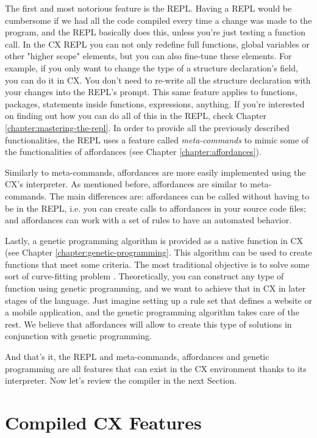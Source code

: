 \documentclass[11pt,fleqn,openany]{book} %
\begin{document}
The first and most notorious feature is the REPL. Having a REPL would be cumbersome if we had all the code compiled every time a change was made to the program, and the REPL basically does this, unless you're just testing a function call. In the CX REPL you can not only redefine full functions, global variables or other "higher scope" elements, but you can also fine-tune these elements. For example, if you only want to change the type of a structure declaration's field, you can do it in CX. You don't need to re-write all the structure declaration with your changes into the REPL's prompt. This same feature applies to functions, packages, statements inside functions, expressions, anything. If you're interested on finding out how you can do all of this in the REPL, check Chapter \ref{chapter:mastering-the-repl}. In order to provide all the previously described functionalities, the REPL uses a feature called \emph{meta-commands} to mimic some of the functionalities of affordances (see Chapter \ref{chapter:affordances}). 

Similarly to meta-commands, affordances are more easily implemented using the CX's interpreter. As mentioned before, affordances are similar to meta-commands. The main differences are: affordances can be called without having to be in the REPL, i.e. you can create calls to affordances in your source code files; and affordances can work with a set of rules to have an automated behavior.

Lastly, a genetic programming algorithm is provided as a native function in CX (see Chapter \ref{chapter:genetic-programming}. This algorithm can be used to create functions that meet some criteria. The most traditional objective is to solve some sort of curve-fitting problem \cite{lancaster1986curve}. Theoretically, you can construct any type of function using genetic programming, and we want to achieve that in CX in later stages of the language. Just imagine setting up a rule set that defines a website or a mobile application, and the genetic programming algorithm takes care of the rest. We believe that affordances will allow to create this type of solutions in conjunction with genetic programming.

And that's it, the REPL and meta-commands, affordances and genetic programming are all features that can exist in the CX environment thanks to its interpreter. Now let's review the compiler in the next Section.

\section{Compiled CX Features}
\end{document}
